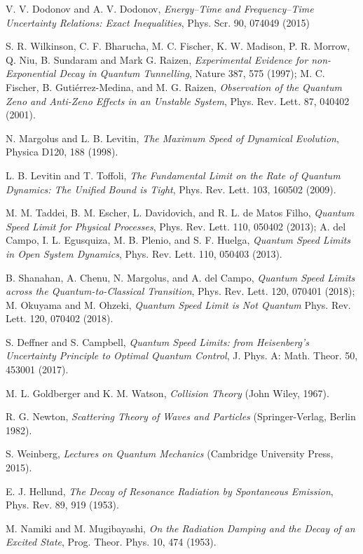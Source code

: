 \documentclass[12pt]{article}
\numberwithin{equation}{section}
\begin{document}
\begin{thebibliography}{}
V. V. Dodonov and A. V. Dodonov,  {\em Energy–Time and Frequency–Time Uncertainty
Relations: Exact Inequalities}, Phys. Scr. 90, 074049 (2015)

S. R. Wilkinson, C. F. Bharucha, M. C. Fischer, K. W. Madison, P. R. Morrow, Q. Niu, B. Sundaram and Mark G. Raizen, {\em Experimental Evidence for non-Exponential Decay in Quantum Tunnelling}, Nature 387, 575 (1997); M. C. Fischer, B. Gutiérrez-Medina, and M. G. Raizen, {\em Observation of the Quantum Zeno and Anti-Zeno Effects in an Unstable System},
Phys. Rev. Lett. 87, 040402 (2001).

 N.  Margolus  and  L.  B.  Levitin,  {\em The  Maximum  Speed  of  Dynamical  Evolution},
Physica D120, 188  (1998).

 L. B. Levitin and T. Toffoli, {\em The Fundamental Limit on the Rate of Quantum Dynamics: The Unified Bound is Tight}, Phys. Rev. Lett. 103, 160502 (2009).

   M. M. Taddei,  B. M. Escher, L. Davidovich, and R. L. de Matos Filho, {\em
Quantum Speed Limit for Physical Processes},  Phys. Rev. Lett. 110, 050402 (2013); A. del Campo, I. L. Egusquiza, M. B. Plenio, and S. F. Huelga, {\em Quantum Speed Limits in Open System Dynamics}, Phys. Rev. Lett. 110, 050403 (2013).

 B. Shanahan, A. Chenu, N. Margolus, and A. del Campo, {\em
Quantum Speed Limits across the Quantum-to-Classical Transition},  Phys. Rev. Lett. 120, 070401 (2018); M. Okuyama and M. Ohzeki, {\em Quantum Speed Limit is Not Quantum}
Phys. Rev. Lett. 120, 070402 (2018).

 S. Deffner and S. Campbell, {\em Quantum Speed Limits: from Heisenberg's Uncertainty Principle to Optimal Quantum Control}, J. Phys. A: Math. Theor. 50, 453001 (2017).

 M. L. Goldberger and K. M. Watson, {\em Collision Theory} (John Wiley, 1967).


 R. G. Newton, {\em Scattering Theory of Waves and Particles}
(Springer-Verlag, Berlin 1982).

 S. Weinberg, {\em Lectures on Quantum Mechanics} (Cambridge University Press, 2015).


 E. J. Hellund, {\em The Decay of Resonance Radiation by Spontaneous Emission}, Phys. Rev. 89, 919 (1953).

     M. Namiki and M. Mugibayashi, {\em On the Radiation Damping and the Decay of an Excited State}, Prog. Theor. Phys. 10, 474 (1953).


\end{thebibliography}
\end{document}
